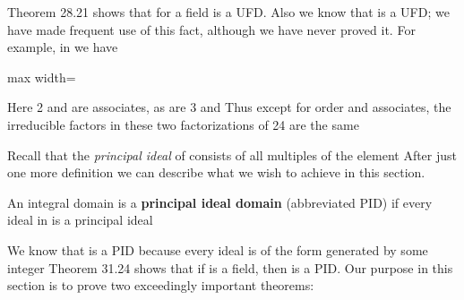 \documentclass[11pt,oneside]{article}
\begin{document}
\begin{BookBody}
 Theorem 28.21 shows that for a field  is a UFD. Also we know that  is a UFD; we have made frequent use of this fact, although we have never proved it. For example, in  we have

\begin{center}\begin{adjustbox}{max width=\linewidth}\end{adjustbox}\end{center}

\noindent Here 2 and  are associates, as are 3 and  Thus except for order and associates, the irreducible factors in these two factorizations of 24 are the same\BookEnd{\blacktriangle}

Recall that the\textit{ principal ideal}  of  consists of all multiples of the element  After just one more definition we can describe what we wish to achieve in this section.

 An integral domain  is a\textbf{ principal ideal domain} (abbreviated PID) if every ideal in  is a principal ideal\BookEnd{\blacksquare}

We know that  is a PID because every ideal is of the form  generated by some integer  Theorem 31.24 shows that if  is a field, then  is a PID. Our purpose in this section is to prove two exceedingly important theorems:



\end{BookBody}

\BookNarrativetrue
\end{document}
